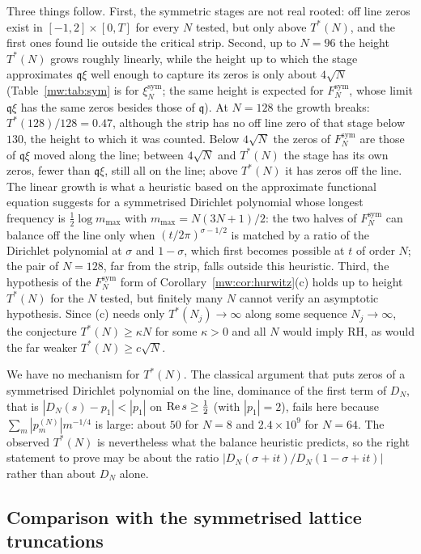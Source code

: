 Three things follow. First, the symmetric stages are not real rooted: off line zeros exist in $[-1,2]\times[0,T]$ for every $N$ tested, but only above $T^*(N)$, and the first ones found lie outside the critical strip. Second, up to $N=96$ the height $T^*(N)$ grows roughly linearly, while the height up to which the stage approximates $\mathfrak q\xi$ well enough to capture its zeros is only about $4\sqrt N$ (Table~\ref{mw:tab:sym} is for $\xi_N^{\mathrm{sym}}$; the same height is expected for $F_N^{\mathrm{sym}}$, whose limit $\mathfrak q\xi$ has the same zeros besides those of $\mathfrak q$). At $N=128$ the growth breaks: $T^*(128)/128=0.47$, although the strip has no off line zero of that stage below $130$, the height to which it was counted. Below $4\sqrt N$ the zeros of $F^{\mathrm{sym}}_N$ are those of $\mathfrak q\xi$ moved along the line; between $4\sqrt N$ and $T^*(N)$ the stage has its own zeros, fewer than $\mathfrak q\xi$, still all on the line; above $T^*(N)$ it has zeros off the line. The linear growth is what a heuristic based on the approximate functional equation suggests for a symmetrised Dirichlet polynomial whose longest frequency is $\frac12\log m_{\max}$ with $m_{\max}=N(3N+1)/2$: the two halves of $F_N^{\mathrm{sym}}$ can balance off the line only when $(t/2\pi)^{\sigma-1/2}$ is matched by a ratio of the Dirichlet polynomial at $\sigma$ and $1-\sigma$, which first becomes possible at $t$ of order $N$; the pair of $N=128$, far from the strip, falls outside this heuristic. Third, the hypothesis of the $F_N^{\mathrm{sym}}$ form of Corollary~\ref{mw:cor:hurwitz}(c) holds up to height $T^*(N)$ for the $N$ tested, but finitely many $N$ cannot verify an asymptotic hypothesis. Since (c) needs only $T^*(N_j)\to\infty$ along some sequence $N_j\to\infty$, the conjecture $T^*(N)\geq\kappa N$ for some $\kappa>0$ and all $N$ would imply RH, as would the far weaker $T^*(N)\geq c\sqrt N$.

We have no mechanism for $T^*(N)$. The classical argument that puts zeros of a symmetrised Dirichlet polynomial on the line, dominance of the first term of $D_N$, that is $|D_N(s)-p_1|<|p_1|$ on $\operatorname{Re} s\geq\tfrac12$ (with $|p_1|=2$), fails here because $\sum_m|p^{(N)}_m|m^{-1/4}$ is large: about $50$ for $N=8$ and $2.4\times10^9$ for $N=64$. The observed $T^*(N)$ is nevertheless what the balance heuristic predicts, so the right statement to prove may be about the ratio $|D_N(\sigma+it)/D_N(1-\sigma+it)|$ rather than about $D_N$ alone.

\subsection{Comparison with the symmetrised lattice truncations}

